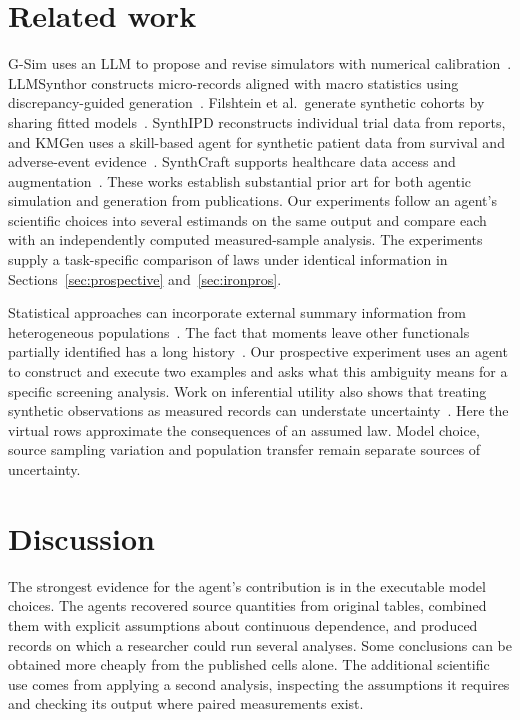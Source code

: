 \documentclass[sigconf,anonymous,review]{acmart}
\begin{document}
\section{Related work}
G-Sim uses an LLM to propose and revise simulators with numerical calibration~\cite{gsim}. LLMSynthor constructs micro-records aligned with macro statistics using discrepancy-guided generation~\cite{llmsynthor}. Filshtein et al.\ generate synthetic cohorts by sharing fitted models~\cite{filshtein}. SynthIPD reconstructs individual trial data from reports, and KMGen uses a skill-based agent for synthetic patient data from survival and adverse-event evidence~\cite{synthipd,kmgen}. SynthCraft supports healthcare data access and augmentation~\cite{synthcraft}. These works establish substantial prior art for both agentic simulation and generation from publications. Our experiments follow an agent's scientific choices into several estimands on the same output and compare each with an independently computed measured-sample analysis. The experiments supply a task-specific comparison of laws under identical information in Sections~\ref{sec:prospective} and~\ref{sec:ironpros}.

Statistical approaches can incorporate external summary information from heterogeneous populations~\cite{syndi}. The fact that moments leave other functionals partially identified has a long history~\cite{bounds}. Our prospective experiment uses an agent to construct and execute two examples and asks what this ambiguity means for a specific screening analysis. Work on inferential utility also shows that treating synthetic observations as measured records can understate uncertainty~\cite{inferential}. Here the virtual rows approximate the consequences of an assumed law. Model choice, source sampling variation and population transfer remain separate sources of uncertainty.

\section{Discussion}
The strongest evidence for the agent's contribution is in the executable model choices. The agents recovered source quantities from original tables, combined them with explicit assumptions about continuous dependence, and produced records on which a researcher could run several analyses. Some conclusions can be obtained more cheaply from the published cells alone. The additional scientific use comes from applying a second analysis, inspecting the assumptions it requires and checking its output where paired measurements exist.
\end{document}
